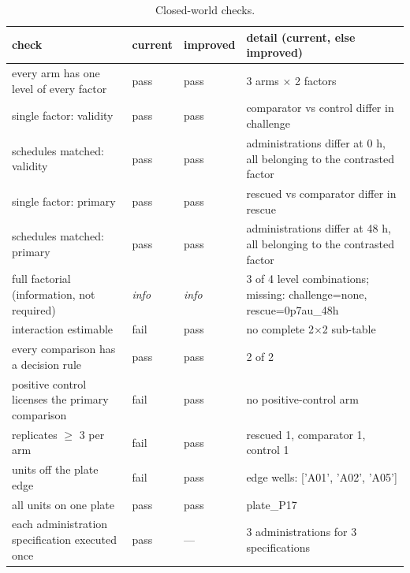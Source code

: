 \documentclass[10pt,a4paper]{article}
\begin{document}
\begin{table}[tbp]\centering\footnotesize
\caption{Closed-world checks.}\label{tab:cw}
\begin{tabularx}{\linewidth}{@{}p{4.4cm}p{1.2cm}p{1.2cm}X@{}}\toprule check & current & improved & detail (current, else improved) \\ \midrule
every arm has one level of every factor & \textcolor{green!45!black}{pass} & \textcolor{green!45!black}{pass} & 3 arms $\times$ 2 factors \\
single factor: validity & \textcolor{green!45!black}{pass} & \textcolor{green!45!black}{pass} & comparator vs control differ in challenge \\
schedules matched: validity & \textcolor{green!45!black}{pass} & \textcolor{green!45!black}{pass} & administrations differ at 0 h, all belonging to the contrasted factor \\
single factor: primary & \textcolor{green!45!black}{pass} & \textcolor{green!45!black}{pass} & rescued vs comparator differ in rescue \\
schedules matched: primary & \textcolor{green!45!black}{pass} & \textcolor{green!45!black}{pass} & administrations differ at 48 h, all belonging to the contrasted factor \\
full factorial (information, not required) & \textit{info} & \textit{info} & 3 of 4 level combinations; missing: challenge=none, rescue=0p7au\_\allowbreak{}48h \\
interaction estimable & \textcolor{red!65!black}{fail} & \textcolor{green!45!black}{pass} & no complete 2$\times$2 sub-table \\
every comparison has a decision rule & \textcolor{green!45!black}{pass} & \textcolor{green!45!black}{pass} & 2 of 2 \\
positive control licenses the primary comparison & \textcolor{red!65!black}{fail} & \textcolor{green!45!black}{pass} & no positive-control arm \\
replicates $\geq$ 3 per arm & \textcolor{red!65!black}{fail} & \textcolor{green!45!black}{pass} & rescued 1, comparator 1, control 1 \\
units off the plate edge & \textcolor{red!65!black}{fail} & \textcolor{green!45!black}{pass} & edge wells: ['A01', 'A02', 'A05'] \\
all units on one plate & \textcolor{green!45!black}{pass} & \textcolor{green!45!black}{pass} & plate\_\allowbreak{}P17 \\
each administration specification executed once & \textcolor{green!45!black}{pass} & --- & 3 administrations for 3 specifications \\

\end{tabularx}
\end{table}
\end{document}

